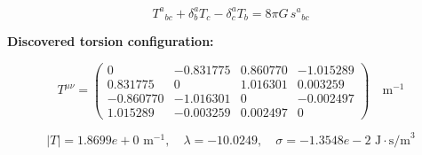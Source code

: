 
\begin{equation}
  T^a{}_{bc} + \delta^a_b T_c - \delta^a_c T_b = 8\pi G \, s^a{}_{bc}
\end{equation}

\textbf{Discovered torsion configuration:}

\begin{equation}
  T^{\mu\nu} = \begin{pmatrix}
    0 & -0.831775 & 0.860770 & -1.015289 \\
    0.831775 & 0 & 1.016301 & 0.003259 \\
    -0.860770 & -1.016301 & 0 & -0.002497 \\
    1.015289 & -0.003259 & 0.002497 & 0
  \end{pmatrix} \quad \text{m}^{-1}
\end{equation}

\begin{equation}
  |T| = 1.8699e+0 \text{ m}^{-1}, \quad
  \lambda = -10.0249, \quad
  \sigma = -1.3548e-2 \text{ J}\cdot\text{s/m}^3
\end{equation}